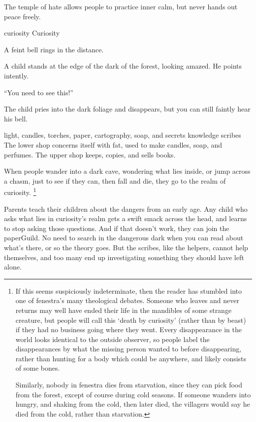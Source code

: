 \begin{multicols}{2}
The temple of hate allows people to practice inner calm, but never hands out peace freely.

  {\gls{curiosity}}%
  {Curiosity}%
  {
    A feint bell rings in the distance.

    A child stands at the edge of the dark of the forest, looking amazed.
    He points intently.

    {\sffamily``You need to see this!''}

    The child pries into the dark foliage and disappears, but you can still faintly hear his bell.
  }%
  {light, candles, torches, paper, cartography, soap, and secrets}%
  {knowledge}%
  {\Glspl{scribe}}%
  {
    The lower shop concerns itself with fat, used to make candles, soap, and perfumes.
    The upper shop keeps, copies, and sells books.
  }%

When people wander into a dark cave, wondering what lies inside, or jump across a chasm, just to see if they can, then fall and die, they go to the realm of curiosity.%
\footnote{If this seems suspiciously indeterminate, then the reader has stumbled into one of \gls{fenestra}'s many theological debates.
Someone who leaves and never returns may well have ended their life in the mandibles of some strange creature, but people will call this `death by curiosity' (rather than by beast) if they had no business going where they went.
Every disappearance in the world looks identical to the outside observer, so people label the disappearances by what the missing person wanted to before disappearing, rather than hunting for a body which could be anywhere, and likely consists of some bones.

Similarly, nobody in \gls{fenestra} dies from starvation, since they can pick food from the forest, except of course during cold seasons.
If someone wanders into  hungry, and shaking from the cold, then later died, the villagers would say he died from the cold, rather than starvation.}

Parents teach their children about the dangers from an early age.
Any child who asks what lies in curiosity's realm gets a swift smack across the head, and learns to stop asking those questions.
And if that doesn't work, they can join the \gls{paperGuild}.
No need to search in the dangerous dark when you can read about what's there, or so the theory goes.
But the scribes, like the helpers, cannot help themselves, and too many end up investigating something they should have left alone.


\end{multicols}
